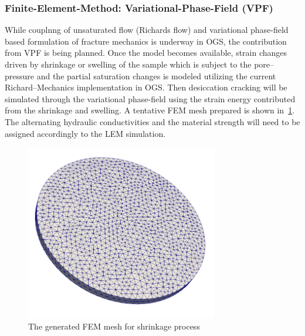 \subsubsection*{Finite-Element-Method: Variational-Phase-Field (VPF)}

While couplnng of unsaturated flow (Richards flow) and variational phase-field based formulation of fracture mechanics is underway in OGS, the contribution from VPF is being planned. 
Once the model becomes available, strain changes driven by shrinkage or swelling of the sample which is subject to the pore--pressure and the partial saturation changes is modeled utilizing the current Richard--Mechanics implementation in OGS. Then desiccation cracking will be simulated through the variational phase-field using the strain energy contributed from the shrinkage and swelling.
A tentative FEM mesh prepared is shown in~\ref{fig:ME5_VPF_setup}.
The alternating hydraulic conductivities and the material strength will need to be assigned accordingly to the LEM simulation.

\begin{figure}[!ht]
\centering
\includegraphics[width=0.75\textwidth]{figures/ME5_VPF_mesh.png}
\caption{The generated FEM mesh for shrinkage process}
\label{fig:ME5_VPF_setup}
\end{figure} 

